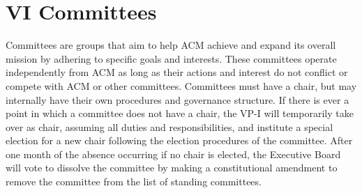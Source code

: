 
\section{VI \textendash{} Committees}
Committees are groups that aim to help ACM achieve and expand its overall
mission by adhering to specific goals and interests. These committees operate
independently from ACM as long as their actions and interest do not conflict or
compete with ACM or other committees. Committees must have a chair, but may
internally have their own procedures and governance structure. If there is ever
a point in which a committee does not have a chair, the VP-I will temporarily
take over as chair, assuming all duties and responsibilities, and institute a
special election for a new chair following the election procedures of the
committee. After one month of the absence occurring if no chair is elected, the
Executive Board will vote to dissolve the committee by making a constitutional
amendment to remove the committee from the list of standing committees.

